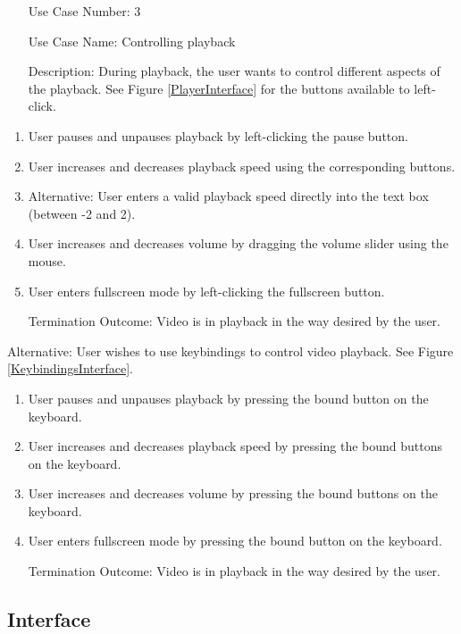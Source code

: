 \documentclass[10pt,conference,onecolumn,compsoc]{IEEEtran}
\begin{document}
\begin{itemize}
\item[Use Case Number:] 3
\item[Use Case Name:] Controlling playback
\item[Description:] During playback, the user wants to control different aspects of the playback. See Figure \ref{PlayerInterface} for the buttons available to left-click. 
\end{itemize}

\begin{enumerate}
\item User pauses and unpauses playback by left-clicking the pause button. 
\item User increases and decreases playback speed using the corresponding buttons.
\item Alternative: User enters a valid playback speed directly into the text box (between -2 and 2).
\item User increases and decreases volume by dragging the volume slider using the mouse.
\item User enters fullscreen mode by left-clicking the fullscreen button.
\item[Termination Outcome:] Video is in playback in the way desired by the user.
\end{enumerate}

Alternative: User wishes to use keybindings to control video playback. See Figure \ref{KeybindingsInterface}.
\begin{enumerate}
\item User pauses and unpauses playback by pressing the bound button on the keyboard.
\item User increases and decreases playback speed by pressing the bound buttons on the keyboard.
\item User increases and decreases volume by pressing the bound buttons on the keyboard.
\item User enters fullscreen mode by pressing the bound button on the keyboard.
\item[Termination Outcome:] Video is in playback in the way desired by the user.
\end{enumerate}


\subsection{Interface}
\end{document}

